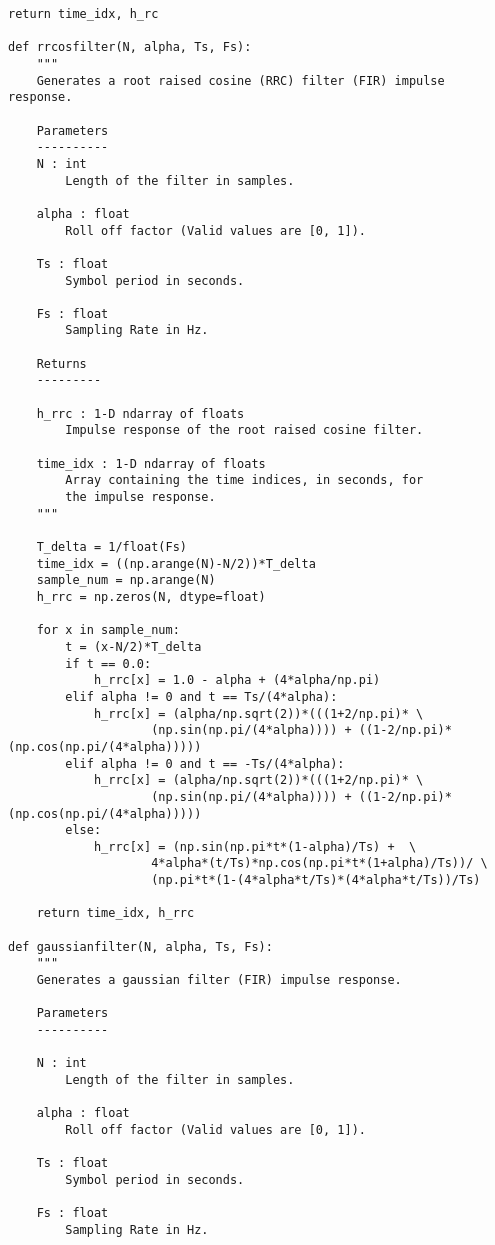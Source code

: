 \begin{lstlisting}[breaklines]
    return time_idx, h_rc

def rrcosfilter(N, alpha, Ts, Fs):
    """
    Generates a root raised cosine (RRC) filter (FIR) impulse response.

    Parameters
    ----------
    N : int
        Length of the filter in samples.

    alpha : float
        Roll off factor (Valid values are [0, 1]).

    Ts : float
        Symbol period in seconds.

    Fs : float
        Sampling Rate in Hz.

    Returns
    ---------

    h_rrc : 1-D ndarray of floats
        Impulse response of the root raised cosine filter.

    time_idx : 1-D ndarray of floats
        Array containing the time indices, in seconds, for
        the impulse response.
    """

    T_delta = 1/float(Fs)
    time_idx = ((np.arange(N)-N/2))*T_delta
    sample_num = np.arange(N)
    h_rrc = np.zeros(N, dtype=float)

    for x in sample_num:
        t = (x-N/2)*T_delta
        if t == 0.0:
            h_rrc[x] = 1.0 - alpha + (4*alpha/np.pi)
        elif alpha != 0 and t == Ts/(4*alpha):
            h_rrc[x] = (alpha/np.sqrt(2))*(((1+2/np.pi)* \
                    (np.sin(np.pi/(4*alpha)))) + ((1-2/np.pi)*(np.cos(np.pi/(4*alpha)))))
        elif alpha != 0 and t == -Ts/(4*alpha):
            h_rrc[x] = (alpha/np.sqrt(2))*(((1+2/np.pi)* \
                    (np.sin(np.pi/(4*alpha)))) + ((1-2/np.pi)*(np.cos(np.pi/(4*alpha)))))
        else:
            h_rrc[x] = (np.sin(np.pi*t*(1-alpha)/Ts) +  \
                    4*alpha*(t/Ts)*np.cos(np.pi*t*(1+alpha)/Ts))/ \
                    (np.pi*t*(1-(4*alpha*t/Ts)*(4*alpha*t/Ts))/Ts)

    return time_idx, h_rrc

def gaussianfilter(N, alpha, Ts, Fs):
    """
    Generates a gaussian filter (FIR) impulse response.

    Parameters
    ----------

    N : int
        Length of the filter in samples.

    alpha : float
        Roll off factor (Valid values are [0, 1]).

    Ts : float
        Symbol period in seconds.

    Fs : float
        Sampling Rate in Hz.


\end{lstlisting}
